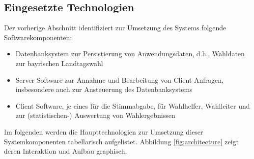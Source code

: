 \documentclass[a4paper,12pt]{article}
\begin{document}
\subsection{Eingesetzte Technologien}
Der vorherige Abschnitt identifiziert zur Umsetzung des Systems folgende Softwarekomponenten:
\begin{itemize}
      \item Datenbanksystem zur Persistierung von Anwendungsdaten, d.h., Wahldaten zur bayrischen Landtagswahl
      \item Server Software zur Annahme und Bearbeitung von Client-Anfragen, insbesondere auch zur Ansteuerung des Datenbanksystems
      \item Client Software, je eines für die Stimmabgabe, für Wahlhelfer, Wahlleiter und zur (statistischen-) Auswertung von Wahlergebnissen 
\end{itemize}
Im folgenden werden die Haupttechnologien zur Umsetzung dieser Systemkomponenten tabellarisch aufgelistet. Abbildung \ref{fig:architecture} zeigt
deren Interaktion und Aufbau graphisch.
\end{document}
